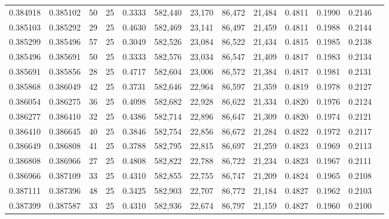 \begin{tabular}{rrrrrrrrrrrrr}
0.384918 & 0.385102 &    50 &  25 &                                     0.3333 & 582,440 &  23,170 &  86,472 &  21,484 & 0.4811 & 0.1990 & 0.2146 \\
0.385103 & 0.385292 &    29 &  25 &                                     0.4630 & 582,469 &  23,141 &  86,497 &  21,459 & 0.4811 & 0.1988 & 0.2144 \\
0.385299 & 0.385496 &    57 &  25 &                                     0.3049 & 582,526 &  23,084 &  86,522 &  21,434 & 0.4815 & 0.1985 & 0.2138 \\
0.385496 & 0.385691 &    50 &  25 &                                     0.3333 & 582,576 &  23,034 &  86,547 &  21,409 & 0.4817 & 0.1983 & 0.2134 \\
0.385691 & 0.385856 &    28 &  25 &                                     0.4717 & 582,604 &  23,006 &  86,572 &  21,384 & 0.4817 & 0.1981 & 0.2131 \\
0.385868 & 0.386049 &    42 &  25 &                                     0.3731 & 582,646 &  22,964 &  86,597 &  21,359 & 0.4819 & 0.1978 & 0.2127 \\
0.386054 & 0.386275 &    36 &  25 &                                     0.4098 & 582,682 &  22,928 &  86,622 &  21,334 & 0.4820 & 0.1976 & 0.2124 \\
0.386277 & 0.386410 &    32 &  25 &                                     0.4386 & 582,714 &  22,896 &  86,647 &  21,309 & 0.4820 & 0.1974 & 0.2121 \\
0.386410 & 0.386645 &    40 &  25 &                                     0.3846 & 582,754 &  22,856 &  86,672 &  21,284 & 0.4822 & 0.1972 & 0.2117 \\
0.386649 & 0.386808 &    41 &  25 &                                     0.3788 & 582,795 &  22,815 &  86,697 &  21,259 & 0.4823 & 0.1969 & 0.2113 \\
0.386808 & 0.386966 &    27 &  25 &                                     0.4808 & 582,822 &  22,788 &  86,722 &  21,234 & 0.4823 & 0.1967 & 0.2111 \\
0.386966 & 0.387109 &    33 &  25 &                                     0.4310 & 582,855 &  22,755 &  86,747 &  21,209 & 0.4824 & 0.1965 & 0.2108 \\
0.387111 & 0.387396 &    48 &  25 &                                     0.3425 & 582,903 &  22,707 &  86,772 &  21,184 & 0.4827 & 0.1962 & 0.2103 \\
0.387399 & 0.387587 &    33 &  25 &                                     0.4310 & 582,936 &  22,674 &  86,797 &  21,159 & 0.4827 & 0.1960 & 0.2100 \\

\end{tabular}
